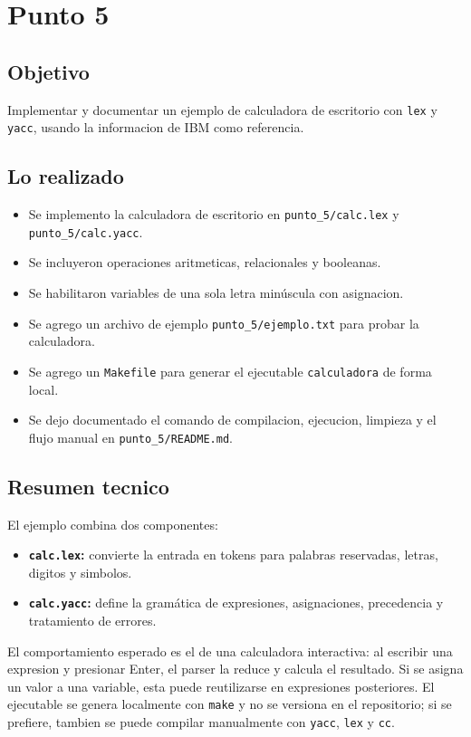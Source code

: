 \documentclass[12pt,a4paper]{article}
\begin{document}
\section{Punto 5}
\subsection*{Objetivo}
Implementar y documentar un ejemplo de calculadora de escritorio con \texttt{lex} y \texttt{yacc}, usando la informacion de IBM como referencia.

\subsection*{Lo realizado}
\begin{itemize}
    \item Se implemento la calculadora de escritorio en \texttt{punto\_5/calc.lex} y \texttt{punto\_5/calc.yacc}.
    \item Se incluyeron operaciones aritmeticas, relacionales y booleanas.
    \item Se habilitaron variables de una sola letra min\'uscula con asignacion.
    \item Se agrego un archivo de ejemplo \texttt{punto\_5/ejemplo.txt} para probar la calculadora.
    \item Se agrego un \texttt{Makefile} para generar el ejecutable \texttt{calculadora} de forma local.
    \item Se dejo documentado el comando de compilacion, ejecucion, limpieza y el flujo manual en \texttt{punto\_5/README.md}.
\end{itemize}

\subsection*{Resumen tecnico}
El ejemplo combina dos componentes:
\begin{itemize}
    \item \textbf{\texttt{calc.lex}:} convierte la entrada en tokens para palabras reservadas, letras, digitos y simbolos.
    \item \textbf{\texttt{calc.yacc}:} define la gram\'atica de expresiones, asignaciones, precedencia y tratamiento de errores.
\end{itemize}

El comportamiento esperado es el de una calculadora interactiva: al escribir una expresion y presionar Enter, el parser la reduce y calcula el resultado. Si se asigna un valor a una variable, esta puede reutilizarse en expresiones posteriores. El ejecutable se genera localmente con \texttt{make} y no se versiona en el repositorio; si se prefiere, tambien se puede compilar manualmente con \texttt{yacc}, \texttt{lex} y \texttt{cc}.
\end{document}
